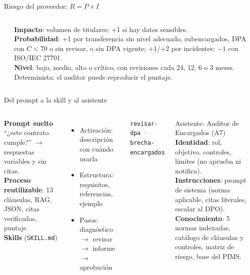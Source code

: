 \documentclass[aspectratio=169,10pt]{beamer}
\begin{document}
\begin{frame}{Riesgo del proveedor: $R = P \times I$}
\begin{columns}[c]
\begin{center}
\end{center}
\small
\textbf{Impacto}: volumen de titulares; +1 si hay datos sensibles.\\[3pt]
\textbf{Probabilidad}: +1 por transferencia sin nivel adecuado, subencargados, DPA con $C<70$ o sin revisar, o sin DPA vigente; +1/+2 por incidentes; $-1$ con ISO/IEC 27701.\\[3pt]
\textbf{Nivel}: bajo, medio, alto o crítico, con revisiones cada 24, 12, 6 o 3 meses.\\[3pt]
\alert{Determinista}: el auditor puede reproducir el puntaje.
\end{columns}
\end{frame}

\begin{frame}{Del prompt a la skill y al asistente}
\begin{columns}[T]
\small
\textbf{Prompt suelto} ``¿este contrato cumple?'' $\rightarrow$ respuestas variables y sin citas.\\[4pt]
\textbf{Proceso reutilizable}: 13 cláusulas, RAG, JSON, citas verificadas, puntaje.\\[4pt]
\textbf{Skills} (\texttt{SKILL.md})
\begin{itemize}\footnotesize
  \item \alert{Activación}: descripción con cuándo usarla
  \item \alert{Estructura}: requisitos, referencias, ejemplo
  \item \alert{Pasos}: diagnóstico $\rightarrow$ revisar $\rightarrow$ informe $\rightarrow$ aprobación
\end{itemize}
\texttt{revisar-dpa} · \texttt{brecha-encargados}
\begin{block}{Asistente: Auditor de Encargados (A7)}
\small
\textbf{Identidad}: rol, objetivo, controles, límites (no aprueba ni notifica).\\[3pt]
\textbf{Instrucciones}: prompt de sistema (norma aplicable, citas literales, escalar al DPO).\\[3pt]
\textbf{Conocimiento}: 5 normas indexadas, catálogo de cláusulas y controles, matriz de riesgo, base del PIMS.
\end{block}
\end{columns}
\end{frame}
\end{document}
